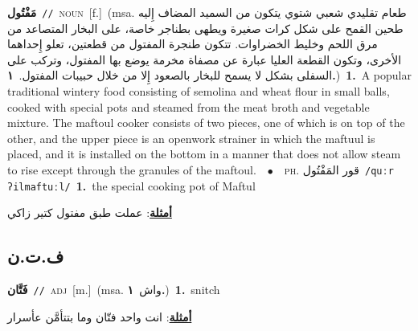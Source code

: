 \documentclass[10pt,a4paper,twoside]{article} %
\begin{document}
\begin{multicols}{2}
{{{{{{{{\setlength\topsep{0pt}\textbf{\foreignlanguage{arabic}{مَفْتُول}}\ {\color{gray}\texttt{//}\color{black}}\ \textsc{noun}\ [f.]\ \color{gray}(msa. \foreignlanguage{arabic}{طعام تقليدي شعبي شتوي يتكون من السميد المضاف إِليه طحين القمح على شكل كرات صغيرة ويطهى بطناجر خاصة، على البخار المتصاعد من مرق اللحم وخليط الخضراوات. تتكون طنجرة المفتول من قطعتين، تعلو إِحداهما الأخرى، وتكون القطعة العليا عبارة عن مصفاة مخرمة يوضع بها المفتول، وتركب على السفلى بشكل لا يسمح للبخار بالصعود إِلا من خلال حبيبات المفتول.}~\foreignlanguage{arabic}{\textbf{١.}})\color{black}\ \textbf{1.}~A popular traditional wintery food consisting of semolina and wheat flour in small balls, cooked with special pots and steamed from the meat broth and vegetable mixture. The maftoul cooker consists of two pieces, one of which is on top of the other, and the upper piece is an openwork strainer in which the maftuul is placed, and it is installed on the bottom in a manner that does not allow steam to rise except through the granules of the maftoul.\ \ $\bullet$\ \ \textsc{ph.} \color{gray} \foreignlanguage{arabic}{قور المَفْتُول}\color{black}\ {\color{gray}\texttt{/{\sffamily quːr ʔilmaftuːl}/}\color{black}}\ \textbf{1.}~the special cooking pot of Maftul\  \begin{flushright}\color{gray}\foreignlanguage{arabic}{\textbf{\underline{\foreignlanguage{arabic}{أمثلة}}}: عملت طبق مفتول كتير زاكي}\end{flushright}\color{black}} \vspace{2mm}

\vspace{-3mm}
\subsection*{\color{blue}\foreignlanguage{arabic}{ف.ت.ن}\color{blue}{}} 

{\setlength\topsep{0pt}\textbf{\foreignlanguage{arabic}{فَتَّان}}\ {\color{gray}\texttt{//}\color{black}}\ \textsc{adj}\ [m.]\ \color{gray}(msa. \foreignlanguage{arabic}{واش}~\foreignlanguage{arabic}{\textbf{١.}})\color{black}\ \textbf{1.}~snitch\  \begin{flushright}\color{gray}\foreignlanguage{arabic}{\textbf{\underline{\foreignlanguage{arabic}{أمثلة}}}: انت واحد فتّان وما بتتأمَّن عأسرار}\end{flushright}\color{black}} \vspace{2mm}

}}}}}}}
\end{multicols}
\end{document}
